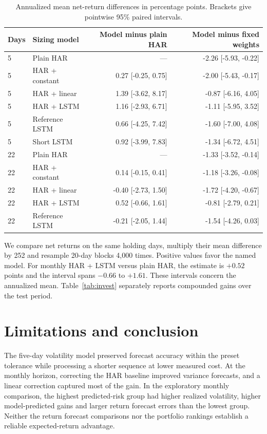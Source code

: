 \documentclass[11pt]{article}
\begin{document}
\clearpage\begin{table}[!ht]\centering\small\caption{Annualized mean net-return differences in percentage points. Brackets give pointwise 95\% paired intervals.}\label{tab:portfolio-ci}
\begin{tabular}{llrr}\toprule
Days & Sizing model & Model minus plain HAR & Model minus fixed weights \\ \midrule
5 & Plain HAR & --- & -2.26 [-5.93, -0.22] \\
5 & HAR + constant & 0.27 [-0.25, 0.75] & -2.00 [-5.43, -0.17] \\
5 & HAR + linear & 1.39 [-3.62, 8.17] & -0.87 [-6.16, 4.05] \\
5 & HAR + LSTM & 1.16 [-2.93, 6.71] & -1.11 [-5.95, 3.52] \\
5 & Reference LSTM & 0.66 [-4.25, 7.42] & -1.60 [-7.00, 4.08] \\
5 & Short LSTM & 0.92 [-3.99, 7.83] & -1.34 [-6.72, 4.51] \\
22 & Plain HAR & --- & -1.33 [-3.52, -0.14] \\
22 & HAR + constant & 0.14 [-0.15, 0.41] & -1.18 [-3.26, -0.08] \\
22 & HAR + linear & -0.40 [-2.73, 1.50] & -1.72 [-4.20, -0.67] \\
22 & HAR + LSTM & 0.52 [-0.66, 1.61] & -0.81 [-2.79, 0.21] \\
22 & Reference LSTM & -0.21 [-2.05, 1.44] & -1.54 [-4.26, 0.03] \\
\bottomrule\end{tabular}\par\vspace{6pt}\begin{minipage}{.96\linewidth}\small
We compare net returns on the same holding days, multiply their mean difference by 252 and resample 20-day blocks 4,000 times. Positive values favor the named model. For monthly HAR + LSTM versus plain HAR, the estimate is $+0.52$ points and the interval spans $-0.66$ to $+1.61$. These intervals concern the annualized mean. Table~\ref{tab:invest} separately reports compounded gains over the test period.
\end{minipage}\end{table}

\section{Limitations and conclusion}
The five-day volatility model preserved forecast accuracy within the preset tolerance while processing a shorter sequence at lower measured cost. At the monthly horizon, correcting the HAR baseline improved variance forecasts, and a linear correction captured most of the gain. In the exploratory monthly comparison, the highest predicted-risk group had higher realized volatility, higher model-predicted gains and larger return forecast errors than the lowest group. Neither the return forecast comparisons nor the portfolio rankings establish a reliable expected-return advantage.
\end{document}

